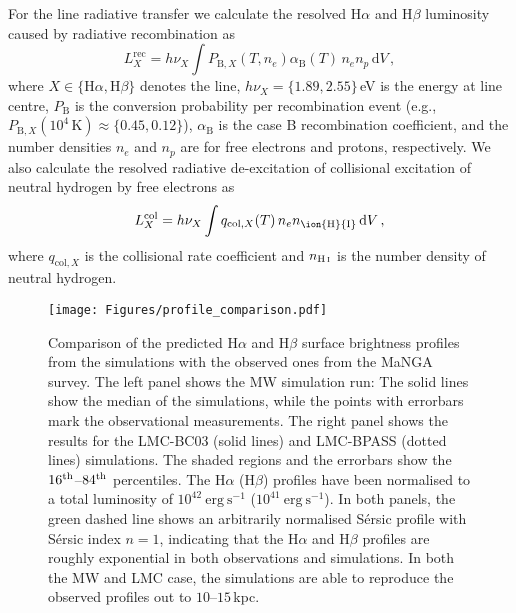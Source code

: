\documentclass[fleqn,usenatbib]{mnras}
\begin{document}
For the line radiative transfer we calculate the resolved H$\alpha$ and H$\beta$ luminosity caused by radiative recombination as
\begin{equation}
  L_X^\text{rec} = h \nu_X \int P_{\text{B},X}(T,n_e) \alpha_\text{B}(T)\,n_e n_p\,\text{d}V \, ,
\end{equation}
where $X \in \{\text{H}\alpha, \text{H}\beta\}$ denotes the line, $h \nu_X = \{1.89, 2.55\}$\,eV is the energy at line centre, $P_\text{B}$ is the conversion probability per recombination event (e.g., $P_{\text{B},X}(10^4\,\text{K}) \approx \{0.45, 0.12\}$), $\alpha_\text{B}$ is the case B recombination coefficient, and the number densities $n_e$ and $n_p$ are for free electrons and protons, respectively. We also calculate the resolved radiative de-excitation of collisional excitation of neutral hydrogen by free electrons as
\begin{equation}
  L_X^\text{col} = h \nu_X \int q_{\text{col},X}(T)\,n_e n_\text{\ion{H}{I}}\,\text{d}V \, ,
\end{equation}
where $q_{\text{col},X}$ is the collisional rate coefficient and $n_\text{H\,\textsc{i}}$ is the number density of neutral hydrogen.

\begin{figure*}
\begin{center}
\texttt{[image: Figures/profile\_comparison.pdf]}
\caption{Comparison of the predicted H$\alpha$ and H$\beta$ surface brightness profiles from the simulations with the observed ones from the MaNGA survey. The left panel shows the MW simulation run: The solid lines show the median of the simulations, while the points with errorbars mark the observational measurements. The right panel shows the results for the LMC-BC03 (solid lines) and LMC-BPASS (dotted lines) simulations. The shaded regions and the errorbars show the $16^{\rm th}$--$84^{\rm th}$ percentiles. The H$\alpha$ (H$\beta$) profiles have been normalised to a total luminosity of $10^{42}~\mathrm{erg}~\mathrm{s}^{-1}$ ($10^{41}~\mathrm{erg}~\mathrm{s}^{-1}$). In both panels, the green dashed line shows an arbitrarily normalised S\'{e}rsic profile with S\'{e}rsic index $n=1$, indicating that the H$\alpha$ and H$\beta$ profiles are roughly exponential in both observations and simulations. In both the MW and LMC case, the simulations are able to reproduce the observed profiles out to $10$--$15$\,kpc.}
\label{fig:profile_comparison}
\end{center}
\end{figure*}
\end{document}
